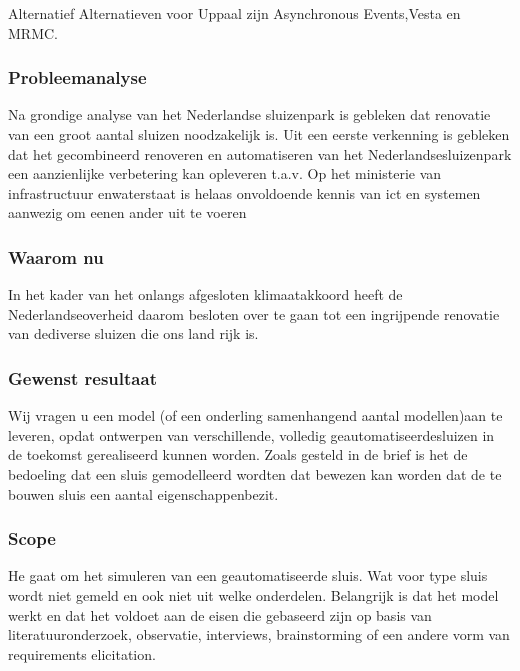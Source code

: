 Alternatief
Alternatieven voor Uppaal zijn Asynchronous Events,Vesta en MRMC.

\subsubsection{Probleemanalyse}

Na grondige analyse van het Nederlandse sluizenpark is gebleken dat renovatie van een groot aantal sluizen noodzakelijk is.  Uit een eerste verkenning is gebleken  dat het gecombineerd renoveren en automatiseren van het Nederlandsesluizenpark een aanzienlijke verbetering kan opleveren t.a.v. 
Op  het  ministerie  van  infrastructuur  enwaterstaat is helaas onvoldoende kennis van ict en systemen aanwezig om eenen ander uit te voeren 

\subsubsection{Waarom nu}
In  het  kader  van  het  onlangs  afgesloten  klimaatakkoord  heeft  de  Nederlandseoverheid  daarom  besloten  over  te  gaan  tot  een  ingrijpende  renovatie  van  dediverse  sluizen  die  ons  land  rijk  is.     

\subsubsection{Gewenst resultaat }


Wij vragen u een model (of een onderling samenhangend aantal modellen)aan  te  leveren,  opdat  ontwerpen  van  verschillende,  volledig  geautomatiseerdesluizen in de toekomst gerealiseerd kunnen worden. 
Zoals  gesteld  in  de  brief  is  het  de  bedoeling  dat  een  sluis  gemodelleerd  wordten  dat  bewezen  kan  worden  dat  de  te  bouwen  sluis  een  aantal  eigenschappenbezit.  

\subsubsection{Scope}

He gaat om het simuleren van een geautomatiseerde sluis. Wat voor type sluis wordt niet gemeld en ook niet uit welke onderdelen. Belangrijk is dat het model werkt en dat het voldoet aan de eisen die gebaseerd zijn op basis van literatuuronderzoek, observatie, interviews, brainstorming of een andere vorm van requirements elicitation.

